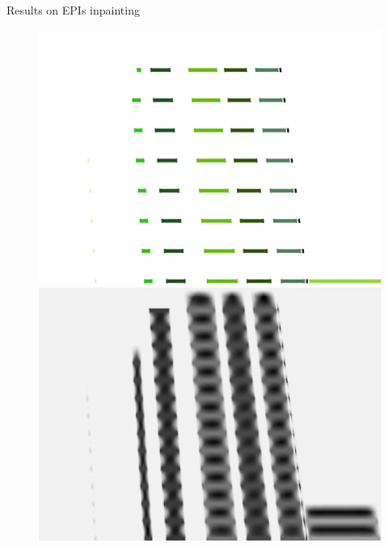 \begin{frame}{Results on EPIs inpainting}
\begin{figure}[!tbp]
  \centering
  \begin{minipage}[b]{0.40\textwidth}
    \includegraphics[width=\textwidth]{./images/EPI-sparse.png}
  \end{minipage}
	\pause
  \begin{minipage}[b]{0.40\textwidth}
    \includegraphics[width=\textwidth]{./images/EPI-inpainted.png}
  \end{minipage}
\end{figure}

\end{frame}


